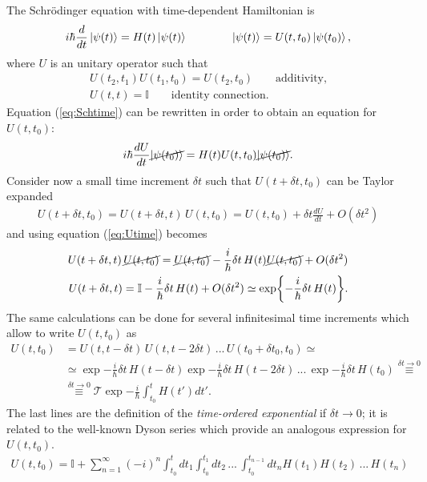 The Schr\"odinger equation with time-dependent Hamiltonian is 
\begin{equation}
    \label{eq:Schtime}
    i \hbar \frac{d}{dt}\ket{\psi(t)} = H(t)\ket{\psi(t)} \qquad \qquad \ket{\psi(t)} = U(t,t_0) \ket{\psi(t_0)}, 
\end{equation}
where $U$ is an unitary operator such that 
\begin{align*}
    U(t_2,t_1) U(t_1,t_0) = U(t_2,t_0) \qquad \text{additivity,} \\
    U(t,t) = \mathbb{I} \qquad \text{identity connection.}
\end{align*}
Equation (\ref{eq:Schtime}) can be rewritten in order to obtain an equation for $U(t,t_0)$:
\begin{equation}
    \label{eq:Utime}
    i \hbar \frac{dU}{dt} \cancel{\ket{\psi(t_0)}}= H(t) U(t,t_0) \cancel{\ket{\psi(t_0)}}.
\end{equation}
Consider now a small time increment $\delta t$ such that $U(t+\delta t,t_0)$ can be Taylor expanded
\begin{align*}
    U(t+\delta t,t_0) = U(t+\delta t,t) \, U(t,t_0) = U(t,t_0) + \delta t \frac{d U}{dt} + O(\delta t^2)
\end{align*}
and using equation (\ref{eq:Utime}) becomes 
\begin{align*}
    U(t+\delta t,t) \, \cancel{U(t,t_0)} = \cancel{U(t,t_0)} - \frac{i}{\hbar} \delta t \, H(t) \cancel{U(t,t_0)} + O(\delta t^2) \\
    U(t+\delta t,t) =\mathbb{I} - \frac{i}{\hbar} \delta t \, H(t) + O(\delta t^2) \simeq \exp{- \frac{i}{\hbar} \delta t \, H(t)}.
\end{align*}
The same calculations can be done for several infinitesimal time increments which allow to write $U(t,t_0)$ as 
\begin{align*}
    U(t,t_0) &= U(t,t-\delta t) \, U(t,t-2\delta t) \, ... \, U(t_0 + \delta t_0, t_0) \simeq \\
    &\simeq \exp{-\frac{i}{\hbar} \delta t \, H(t-\delta t)}  \exp{-\frac{i}{\hbar} \delta t \, H(t-2\delta t)} \, ... \, \exp{- \frac{i}{\hbar} \delta t \, H(t_0)} \overset{\delta t \to 0}{\equiv} \\
    &\overset{\delta t \to 0}{\equiv}  \mathcal{T}\exp{-\frac{i}{\hbar} \int_{t_0}^{t} H(t')dt'}. 
\end{align*}
The last lines are the definition of the \textit{time-ordered exponential} if $\delta t \to 0$; it is related to the well-known Dyson series which provide an analogous expression for $U(t,t_0)$. 
\begin{align*}
    U(t,t_0) = \mathbb{I} + \sum_{n=1}^\infty (-i)^n \int_{t_0}^{t} dt_1 \int_{t_0}^{t_1} dt_2 \, ... \, \int_{t_0}^{t_{n-1}} dt_n H(t_1) H(t_2) \, ... \, H(t_n)
\end{align*}


